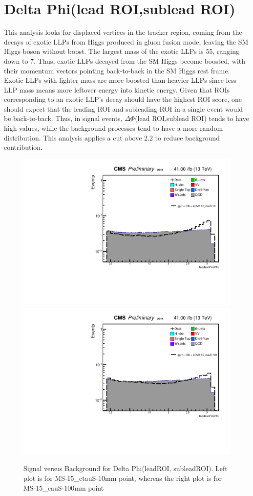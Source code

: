 \section{Delta Phi(lead ROI,sublead ROI)}\label{sec:DeltaPhi}
This analysis looks for displaced vertices in the tracker region, coming from the decays of exotic LLPs from Higgs produced in gluon fusion mode, leaving the SM Higgs boson without boost.
The largest mass of the exotic LLPs is 55\GeV, ranging down to 7\GeV.
Thus, exotic LLPs decayed from the SM Higgs become boosted, with their momentum vectors pointing back-to-back in the SM Higgs rest frame.
Exotic LLPs with lighter mass are more boosted than heavier LLPs since less LLP mass means more leftover energy into kinetic energy.
Given that ROIs corresponding to an exotic LLP's decay should have the highest ROI score, one should expect that the leading ROI and subleading ROI in a single event would be back-to-back.
Thus, in signal events, $\Delta\Phi$(lead ROI,sublead ROI) tends to have high values, while the background processes tend to have a more random distribution.
This analysis applies a cut above 2.2 to reduce background contribution.



 \begin{figure}[h!]
   \caption{Signal versus Background for Delta Phi(leadROI, subleadROI). Left plot is for MS-15\_ctauS-10mm point, whereas the right plot is for MS-15\_cauS-100mm point}
   \label{fig:leadexcPosPhi}
   \centering
   \includegraphics[width=0.40\linewidth]{figs/AnalysisNoteplot_MS-15_ctauS-10_leadexcPosPhi.pdf}
   \includegraphics[width=0.40\linewidth]{figs/AnalysisNoteplot_MS-15_ctauS-100_leadexcPosPhi.pdf}
 \end{figure}


